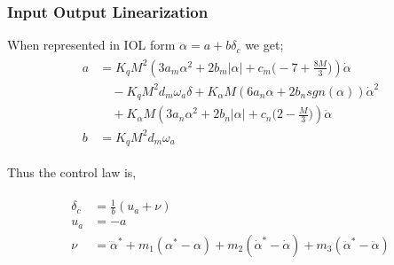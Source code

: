 \documentclass[table,10pt,red]{beamer}	%
\begin{document}
\begin{frame}
\frametitle{Input Output Linearization}
When represented in IOL form $\dddot{\alpha} = a + b\delta_c$ we get; 
\begin{eqnarray*}
	\begin{aligned}
		a &= K_qM^2(3a_m\alpha^2+2b_m|\alpha|+c_m\Big(-7+\frac{8M}{3}\Big))\dot{\alpha} \\ 
		&\quad -K_qM^2d_m\omega_a\delta+K_\alpha M(6a_n\alpha+2b_nsgn(\alpha))\dot{\alpha}^2\\ 
		&\quad+K_\alpha M(3a_n\alpha^2+2b_n|\alpha|+c_n\Big(2-\frac{M}{3}\Big))\ddot{\alpha} \\
		b &= K_q M^2d_m\omega_a \nonumber
	\end{aligned}
	\label{eq5}
\end{eqnarray*}

Thus the control law is, 

\begin{eqnarray*}
	\begin{aligned}
		\delta_c &= \frac{1}{b}(u_a+\nu) \\ \label{iol_control}
		u_a &= -a \label{ua_eqn}\\
		\nu &= \dddot{\alpha}^\ast+m_1(\alpha^\ast-\alpha) + m_2(\dot{\alpha}^\ast-\dot{\alpha}) + m_3(\ddot{\alpha}^\ast-\ddot{\alpha}) \label{nu_eqn}
	\end{aligned}
	\label{eq5}
\end{eqnarray*}

\end{frame}
\end{document}
